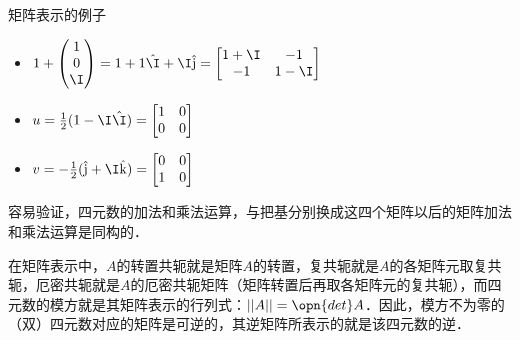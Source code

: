 \begin{example}{矩阵表示的例子}\label{Quat_ex1}
\begin{itemize}
\item $1+\left(\begin{matrix}1\\0\\\I\end{matrix} \right)=1+1\hat{\I}+\I\hat{\mathrm{j}}=\left[\begin{matrix}1+\I&-1\\-1&1-\I\end{matrix} \right]$
\item $u=\frac{1}{2}(1-\I\hat{\I})=\left[\begin{matrix}1&0\\0&0\end{matrix} \right]$
\item $v=-\frac{1}{2}(\hat{\mathrm{j}}+\I\hat{\mathrm{k}})=\left[\begin{matrix}0&0\\1&0\end{matrix} \right]$

\end{itemize}


\end{example}

容易验证，四元数的加法和乘法运算，与把基分别换成这四个矩阵以后的矩阵加法和乘法运算是同构的．

在矩阵表示中，$A$的转置共轭就是矩阵$A$的转置，复共轭就是$A$的各矩阵元取复共轭，厄密共轭就是$A$的厄密共轭矩阵（矩阵转置后再取各矩阵元的复共轭），而四元数的模方就是其矩阵表示的行列式：$||A||=\opn{det}A$．因此，模方不为零的（双）四元数对应的矩阵是可逆的，其逆矩阵所表示的就是该四元数的逆．





